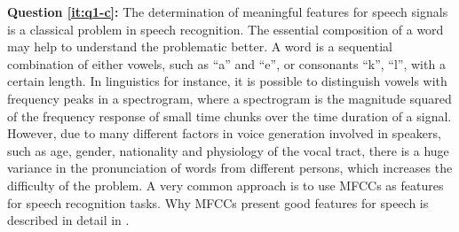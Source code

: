 \textbf{Question \ref{it:q1-c}:} 
The determination of meaningful features for speech signals is a classical problem in speech recognition.
The essential composition of a word may help to understand the problematic better.
A word is a sequential combination of either vowels, such as \enquote{a} and \enquote{e}, or consonants \enquote{k}, \enquote{l}, with a certain length. 
In linguistics for instance, it is possible to distinguish vowels with frequency peaks in a spectrogram, where a spectrogram is the magnitude squared of the frequency response of small time chunks over the time duration of a signal.
However, due to many different factors in voice generation involved in speakers, such as age, gender, nationality and physiology of the vocal tract, there is a huge variance in the pronunciation of words from different persons, which increases the difficulty of the problem.
A very common approach is to use MFCCs as features for speech recognition tasks.
Why MFCCs present good features for speech is described in detail in .



